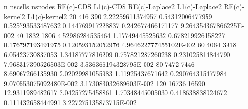           n      nscells     nsnodes      RE(c)-CDS             L1(c)-CDS        RE(c)-Laplace2          L1(c)-Laplace2       RE(c)-kernel2            L1(c)-kernel2      
          20         416         390   2.22259611374957      0.54312006477959   0.525793533487632       0.144769917228837   0.242677466171177       9.264354367866225E-002
          40        1832        1806   4.52986284535464      1.17749445525632   0.678219926158227       0.176797193491975   0.120593152052976       4.964622777455102E-002
          60        4064        3918   6.05423730837053      1.34187777816209   0.757821287260238       0.231025814844790   7.968317390526503E-002  3.536366194328795E-002
          80        7472        7446   8.69067266135930      2.02029981055983    1.11925437671642       0.290764315477984   9.070553075092480E-002  3.173083032689603E-002
         120       16736       16590   12.9311989482617      3.04257275458861    1.70348445005030       0.418638838024672   0.111432658444991       3.227275135873715E-002